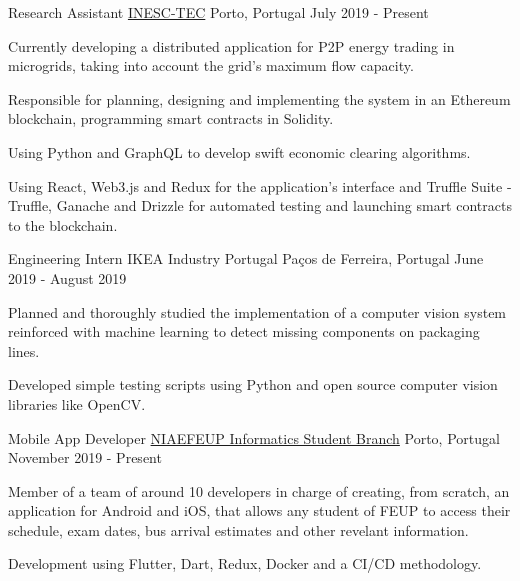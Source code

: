 
\begin{cventries}
  \cventry
    {Research Assistant} %
    {\href{https://www.inesctec.pt/en}{INESC-TEC}} %
    {Porto, Portugal} %
    {July 2019 - Present} %
    {
      \begin{cvitems} %
        \item {Currently developing a distributed application for P2P energy trading in microgrids, taking into account the grid's maximum flow capacity.}
        \item {Responsible for planning, designing and implementing the system in an Ethereum blockchain, programming smart contracts in Solidity.}
        \item {Using Python and GraphQL to develop swift economic clearing algorithms.}
        \item {Using React, Web3.js and Redux for the application's interface and Truffle Suite - Truffle, Ganache and Drizzle for automated testing and launching smart contracts to the blockchain.}
      \end{cvitems}
    }

  \cventry
    {Engineering Intern} %
    {IKEA Industry Portugal} %
    {Paços de Ferreira, Portugal} %
    {June 2019 - August 2019} %
    {
      \begin{cvitems} %
        \item {Planned and thoroughly studied the implementation of a computer vision system reinforced with machine learning to detect missing components on packaging lines.}
        \item {Developed simple testing scripts using Python and open source computer vision libraries like OpenCV.}
      \end{cvitems}
    }

  \cventry
    {Mobile App Developer} %
    {\href{https://ni.fe.up.pt}{NIAEFEUP Informatics Student Branch}} %
    {Porto, Portugal} %
    {November 2019 - Present} %
    {
      \begin{cvitems} %
        \item {Member of a team of around 10 developers in charge of creating, from scratch, an application for Android and iOS, that allows any student of FEUP to access their schedule, exam dates, bus arrival estimates and other revelant information.}
        \item{Development using Flutter, Dart, Redux, Docker and a CI/CD methodology.}
      \end{cvitems}
    }
   
\end{cventries}
